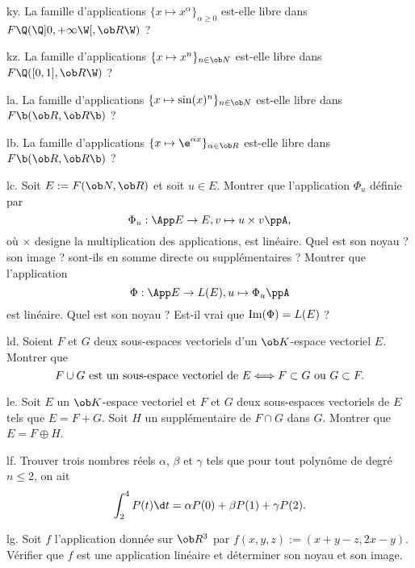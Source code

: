 \exo [Level=1,Fight=1,Learn=0,Field=\EspacesVectoriels,Type=\Exercices,Origin=\Capaces] ky.  
La famille d'applications $\{x\mapsto x^\alpha\}_{\alpha\ge0}$ est-elle libre dans $\sc F\Q(\Q]0,+\infty\W[,\ob R\W)$ ?

\exo [Level=1,Fight=1,Learn=0,Field=\EspacesVectoriels,Type=\Exercices,Origin=\Capaces] kz. 
La famille d'applications $\{x\mapsto x^n\}_{n\in\ob N}$ est-elle libre dans $\sc F\Q([0,1],\ob R\W)$ ?

\exo [Level=1,Fight=1,Learn=0,Field=\EspacesVectoriels,Type=\Exercices,Origin=\Capaces] la. 
La famille d'applications $\{x\mapsto\sin(x)^n\}_{n\in\ob N}$ est-elle libre dans $\sc F\b(\ob R,\ob R\b)$ ?

\exo [Level=1,Fight=1,Learn=0,Field=\EspacesVectoriels,Type=\Exercices,Origin=\Capaces] lb. 
La famille d'applications $\{x\mapsto\e^{\alpha x}\}_{\alpha\in \ob R}$ est-elle libre dans $\sc F\b(\ob R,\ob R\b)$ ?

\exo [Level=1,Fight=2,Learn=2,Field=\EspacesVectoriels,Type=\Exercices,Origin=\Capaces] lc. 
Soit $E:=\sc F(\ob N,\ob R)$ et soit $u\in E$. Montrer que l'application $\Phi_u$ définie par 
$$
\Phi_u:\App E\to E,v\mapsto u\times v\ppA, 
$$
où $\times$ designe la multiplication des applications, est linéaire. Quel est son noyau ? son image ? sont-ils en somme directe ou supplémentaires ?
\pn
Montrer que l'application 
$$
\Phi: \App E\to\sc L(E),u\mapsto \Phi_u\ppA
$$
est linéaire. Quel est son noyau ? Est-il vrai que $\hbox{Im}(\Phi)=\sc L(E)$ ? 

\exo [Origin=,Level=1,Fight=1,Learn=2,Field=\EspacesVectoriels,Type=\Exercices]  ld. 
Soient $F$ et $G$ deux sous-espaces vectoriels d'un $\ob K$-espace vectoriel $E$. Montrer que 
$$
F\cup G\hbox{ est un sous-espace vectoriel de }E\Longleftrightarrow F\subset G\hbox{ ou }G\subset F. 
$$

\exo  [Origin=,Level=1,Fight=1,Learn=2,Field=\EspacesVectoriels,Type=\Exercices] le. 
Soit $E$ un $\ob K$-espace vectoriel et $F$ et $G$ deux sous-espaces vectoriels de $E$ tels que $E=F+G$. Soit $H$ un supplémentaire de $F\cap G$ dans $G$. Montrer que $E=F\oplus H$. 

\exo[Origin=,Level=1,Fight=1,Learn=2,Field=\DimensionFinie,Type=\Exercices] lf. 
Trouver trois nombres réels $\alpha$, $\beta$ et $\gamma$ tels que pour tout polynôme de degré $n\le 2$, on ait
$$
\int_2^4P(t)\d t=\alpha P(0)+\beta P(1)+\gamma P(2).
$$

\exo [Level=1,Fight=0,Learn=1,Field=\EspacesVectoriels,Type=\Exercices,Origin=] lg. 
Soit $f$ l'application donnée sur $\ob R^3$ par $f(x,y,z):=(x+y-z,2x-y)$. Vérifier que $f$ est une application linéaire et déterminer son noyau et son image. 

